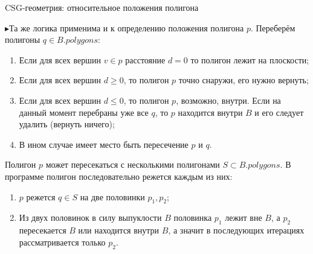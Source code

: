 \documentclass{beamer}
\newcommand{\tri}{{\color{blue!40} $\blacktriangleright$}\:}
\begin{document}
\begin{frame}{CSG-геометрия: относительное положения полигона}
\footnotesize

\tri Та же логика применима и к определению положения полигона $p$. Переберём полигоны $q \in B.polygons$:
\begin{enumerate}
    \item Если для всех вершин $v \in p$ расстояние $d = 0$ то полигон лежит на плоскости;
    \item Если для всех вершин $d \ge 0$, то полигон $p$ точно снаружи, его нужно вернуть;
    \item Если для всех вершин $d \le 0$, то полигон $p$, возможно, внутри. Если на данный момент перебраны уже все $q$, то $p$ находится внутри $B$ и его следует удалить (вернуть ничего);
    \item В ином случае имеет место быть пересечение $p$ и $q$.
\end{enumerate}

Полигон $p$ может пересекаться с несколькими полигонами $S \subset B.polygons$. В программе полигон последовательно режется каждым из них:
\begin{enumerate}
    \item $p$ режется $q \in S$ на две половинки $p_1, p_2$;
    \item Из двух половинок в силу выпуклости $B$ половинка $p_1$ лежит вне $B$, а $p_2$ пересекается $B$ или находится внутри $B$, а значит в последующих итерациях рассматривается только $p_2$.
\end{enumerate}

\end{frame}
\end{document}
